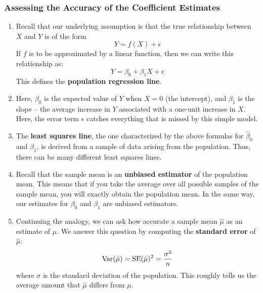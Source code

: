 \documentclass[10pt]{article}
\newcommand{\Var}{{\rm Var}}
\newcommand{\eps}{\epsilon}
\begin{document}
\subsubsection{Assessing the Accuracy of the Coefficient Estimates} 
\begin{enumerate}
	\item Recall that our underlying assumption is that the true relationship between $X$ and $Y$ is of the form $$ Y = f(X) + \eps$$
	If $f$ is to be approximated by a linear function, then we can write this relationship as:
	$$Y = \beta_0 + \beta_1 X + \eps$$
	This defines the \textbf{population regression line}.
	\item Here, $\beta_0$ is the expected value of $Y$ when $X = 0$ (the intercept), and $\beta_1$ is the slope -- the average increase in $Y$ associated with a one-unit increase in $X$.  Here, the error term $\eps$ catches everything that is missed by this simple model.
	\item The \textbf{least squares line}, the one characterized by the above formulas for $\hat \beta_0$ and $\hat \beta_1$, is derived from a sample of data arising from the population.  Thus, there can be many different least squares lines.
	\item Recall that the sample mean is an \textbf{unbiased estimator} of the population mean.  This means that if you take the average over all possible samples of the sample mean, you will exactly obtain the population mean. In the same way, our estimates for $\beta_0$ and $\beta_1$ are unbiased estimators.
	\item Continuing the analogy, we can ask how accurate a sample mean $\hat \mu$ as an estimate of $\mu$.  We answer this question by computing the \textbf{standard error} of $\hat \mu$:
	$$\Var(\hat \mu) = {\rm{SE}}(\hat\mu)^2 = \dfrac{\sigma^2}{n}$$
	where $\sigma$ is the standard deviation of the population.  This roughly tells us the average amount that $\hat \mu$ differs from $\mu$.
	

\end{enumerate}
\end{document}
